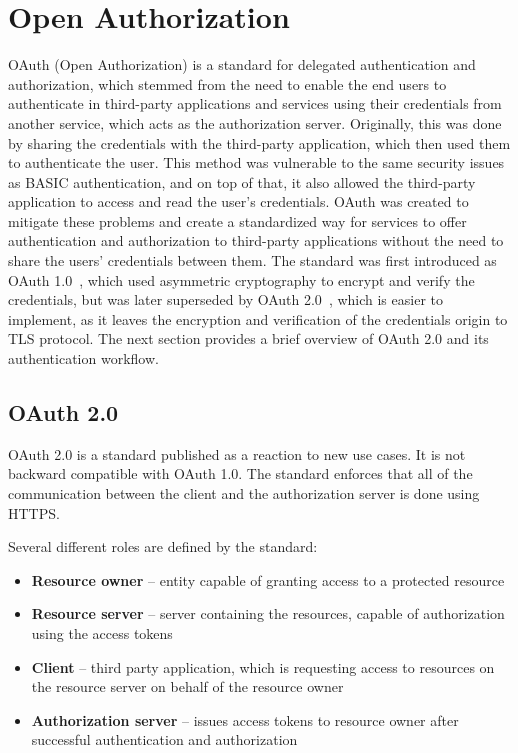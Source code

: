 \section{Open Authorization}
OAuth (Open Authorization) is a standard for delegated authentication and authorization, which stemmed from the need to enable the end users to authenticate in third-party applications and services using their credentials from another service, which acts as the authorization server. Originally, this was done by sharing the credentials with the third-party application, which then used them to authenticate the user. This method was vulnerable to the same security issues as BASIC authentication, and on top of that, it also allowed the third-party application to access and read the user's credentials. OAuth was created to mitigate these problems and create a standardized way for services to offer authentication and authorization to third-party applications without the need to share the users' credentials between them. The standard was first introduced as OAuth 1.0 \cite{oauth1_rfc}, which used asymmetric cryptography to encrypt and verify the credentials, but was later superseded by OAuth 2.0 \cite{oauth2_rfc}, which is easier to implement, as it leaves the encryption and verification of the credentials origin to TLS protocol. The next section provides a brief overview of OAuth 2.0 and its authentication workflow.

\subsection{OAuth 2.0}
OAuth 2.0 is a standard published as a reaction to new use cases. It is not backward compatible with OAuth 1.0. The standard enforces that all of the communication between the client and the authorization server is done using HTTPS.

Several different roles are defined by the standard:
\begin{itemize}
  \item \textbf{Resource owner} -- entity capable of granting access to a protected resource
  \item \textbf{Resource server} -- server containing the resources, capable of authorization using the access tokens
  \item \textbf{Client} -- third party application, which is requesting access to resources on the resource server on behalf of the resource owner
  \item \textbf{Authorization server} -- issues access tokens to resource owner after successful authentication and authorization
\end{itemize}

